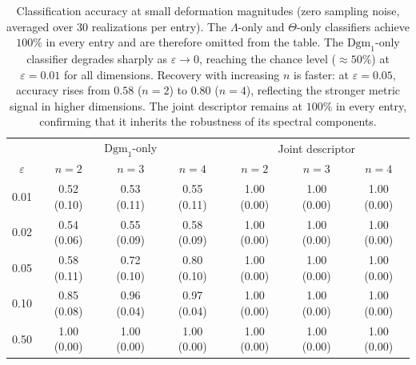\begin{table}[htbp]\centering
\caption{Classification accuracy at small deformation magnitudes (zero sampling
noise, averaged over 30 realizations per entry). The \(\Lambda\)-only and
\(\Theta\)-only classifiers achieve \(100\%\) in every entry and are therefore
omitted from the table. The \(\mathrm{Dgm}_1\)-only classifier degrades sharply
as $\varepsilon \to 0$, reaching the chance level ($\approx 50\%$) at
$\varepsilon=0.01$ for all dimensions. Recovery with increasing \(n\) is
faster: at $\varepsilon=0.05$, accuracy rises from $0.58$ (\(n=2\)) to $0.80$
(\(n=4\)), reflecting the stronger metric signal in higher dimensions. The joint
descriptor remains at \(100\%\) in every entry, confirming that it inherits the
robustness of its spectral components.}
\label{tab:small-eps}
\small
\begin{tabular}{c|ccc|ccc}\hline
& \multicolumn{3}{c|}{\(\mathrm{Dgm}_1\)-only} & \multicolumn{3}{c}{Joint descriptor} \\
$\varepsilon$ & $n=2$ & $n=3$ & $n=4$ & $n=2$ & $n=3$ & $n=4$ \\\hline
0.01 & 0.52 (0.10) & 0.53 (0.11) & 0.55 (0.11) & 1.00 (0.00) & 1.00 (0.00) & 1.00 (0.00) \\
0.02 & 0.54 (0.06) & 0.55 (0.09) & 0.58 (0.09) & 1.00 (0.00) & 1.00 (0.00) & 1.00 (0.00) \\
0.05 & 0.58 (0.11) & 0.72 (0.10) & 0.80 (0.10) & 1.00 (0.00) & 1.00 (0.00) & 1.00 (0.00) \\
0.10 & 0.85 (0.08) & 0.96 (0.04) & 0.97 (0.04) & 1.00 (0.00) & 1.00 (0.00) & 1.00 (0.00) \\
0.50 & 1.00 (0.00) & 1.00 (0.00) & 1.00 (0.00) & 1.00 (0.00) & 1.00 (0.00) & 1.00 (0.00) \\
\hline\end{tabular}\end{table}